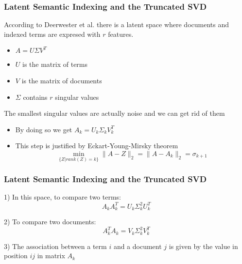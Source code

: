 \begin{frame}[plain]
  \frametitle{Latent Semantic Indexing and the Truncated SVD}
  \begin{block}{}
  According to Deerwester et al. there is a latent space
where documents and indexed terms are expresed with $r$ features.
  \begin{itemize}
    \item $A = U \Sigma V^{T}$
    \item $U$ is the matrix of terms
    \item $V$ is the matrix of documents
    \item $\Sigma$ contains $r$ singular values
  \end{itemize}
  \end{block}

  \begin{block}{}
  The smallest singular values are actually noise and we can
get rid of them
  \begin{itemize}
    \item By doing so we get $A_k = U_k \Sigma_k V_k^{T}$
    \item This step is justified by Eckart-Young-Mirsky theorem 
\begin{equation} 
\min_{\{Z|rank(Z)=k\}} \|A-Z\|_{2} = \|A-A_{k}\|_{2} = \sigma_{k+1}
\end{equation}
  \end{itemize}
  \end{block}
\end{frame}
\begin{frame}[plain]
  \frametitle{Latent Semantic Indexing and the Truncated SVD}
  \begin{block}{}
  1) In this space, to compare two terms:
\begin{equation}
A_{k}A_{k}^{T} = U_k \Sigma_k^{2} U_k^{T}
\end{equation}
  \end{block}

  \begin{block}{}
  2) To compare two documents:
\begin{equation}
A_{k}^{T} A_{k} = V_k \Sigma_k^{2} V_k^{T}
\end{equation}
  \end{block}

  \begin{block}{}
  3) The association between a term $i$ and a document $j$ is given by the value in
position $ij$ in matrix $A_k$
  \end{block}
\end{frame}
